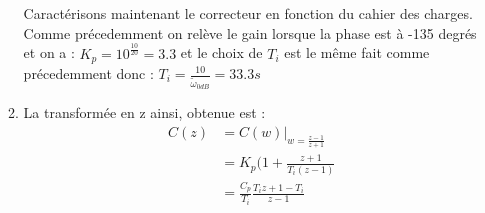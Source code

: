 \documentclass[../main.tex]{subfiles}
\begin{document}
\begin{enumerate}
\begin{enumerate}
Caractérisons maintenant le correcteur en fonction du cahier des charges. Comme précedemment on relève le gain lorsque la phase est à -135 degrés et on a : $K_p = 10^{\frac{10}{20}} = 3.3$ et le choix de $T_i$ est le même fait comme précedemment donc : $T_i = \frac{10}{\tilde{\omega}_{0dB}} = 33.3s$\\

\item La transformée en z ainsi, obtenue est :
\begin{align*}
C(z) &= C(w)|_{w = \frac{z-1}{z+1}}\\
&= K_p(1+\frac{z+1}{T_i(z-1)}\\
&= \frac{C_p}{T_i}\frac{T_iz+1-T_i}{z-1}
\end{align*}
\end{enumerate}
\end{enumerate}
\end{document}
